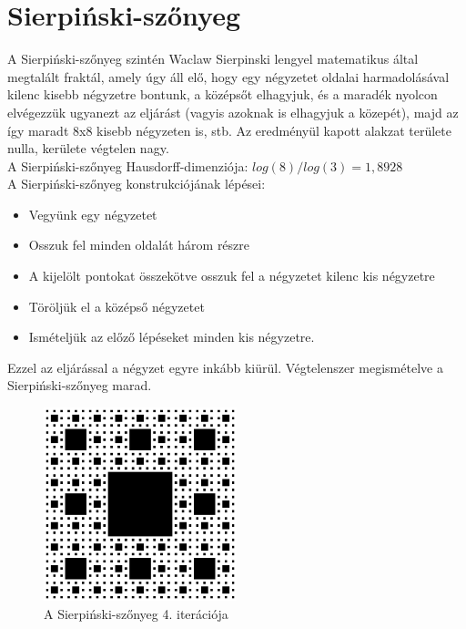 \section*{Sierpiński-szőnyeg}
A Sierpiński-szőnyeg szintén Waclaw Sierpinski lengyel matematikus által megtalált fraktál, amely úgy áll elő, hogy egy négyzetet oldalai harmadolásával kilenc kisebb négyzetre bontunk, a középsőt elhagyjuk, és a maradék nyolcon elvégezzük ugyanezt az eljárást (vagyis azoknak is elhagyjuk a közepét), majd az így maradt 8x8 kisebb négyzeten is, stb. Az eredményül kapott alakzat területe nulla, kerülete végtelen nagy.\\ 
A Sierpiński-szőnyeg Hausdorff-dimenziója: $log(8)/log(3) = 1,8928$
\\A Sierpiński-szőnyeg konstrukciójának lépései:
\begin{itemize}
	\item Vegyünk egy négyzetet
	\item Osszuk fel minden oldalát három részre
	\item A kijelölt pontokat összekötve osszuk fel a négyzetet kilenc kis négyzetre
	\item Töröljük el a középső négyzetet
	\item Ismételjük az előző lépéseket minden kis négyzetre.
\end{itemize}
Ezzel az eljárással a négyzet egyre inkább kiürül. Végtelenszer megismételve a Sierpiński-szőnyeg marad. \cite{sierp-carpet-wiki}
\begin{figure}[!ht]
	\begin{center}
		\includegraphics[width=0.5\textwidth]{img/SierpinskiCarpet}
		\caption[labelInTOC]{A Sierpiński-szőnyeg 4. iterációja}
	\end{center}
\end{figure}
